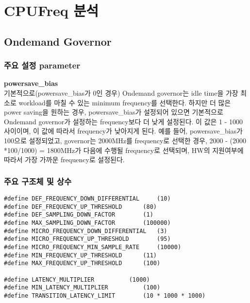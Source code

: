 
\section{CPUFreq 분석}


\subsection{Ondemand Governor}


\subsubsection{주요 설정 parameter}


\textbf{powersave\_bias} \\
기본적으로(powersave\_bias가 0인 경우) Ondemand governor는 idle time을 가장 최소로 workload를 마칠 수 있는 minimum frequency를 선택한다. 
하지만 더 많은 power saving을 원하는 경우, powersave\_bias가 설정되어 있으면 기본적으로 Ondemand governor가 설정하는 frequency보다 더 낮게 설정된다. 
이 값은 1 - 1000 사이이며, 이 값에 따라서 frequency가 낮아지게 된다. 
예를 들어, powersave\_bias가 100으로 설정되었고, governor는 2000MHz를 frequency로 선택한 경우, 2000 - (2000 *100/1000) = 1800MHz가 다음에 수행될 frequency로 선택되며, 
HW의 지원여부에 따라서 가장 가까운 frequency로 설정된다. 

\begin{comment}
\begin{compactenum}
  \item powersavei\_bias
    \begin{compactenum}
      \item 
    \end{compactenum}
\end{compactenum}
\end{comment}



\subsubsection{주요 구조체 및 상수}

\begin{lstlisting}
#define DEF_FREQUENCY_DOWN_DIFFERENTIAL     (10)
#define DEF_FREQUENCY_UP_THRESHOLD      (80)
#define DEF_SAMPLING_DOWN_FACTOR        (1)
#define MAX_SAMPLING_DOWN_FACTOR        (100000)
#define MICRO_FREQUENCY_DOWN_DIFFERENTIAL   (3)
#define MICRO_FREQUENCY_UP_THRESHOLD        (95)
#define MICRO_FREQUENCY_MIN_SAMPLE_RATE     (10000)
#define MIN_FREQUENCY_UP_THRESHOLD      (11)
#define MAX_FREQUENCY_UP_THRESHOLD      (100)

#define LATENCY_MULTIPLIER          (1000)
#define MIN_LATENCY_MULTIPLIER          (100)
#define TRANSITION_LATENCY_LIMIT        (10 * 1000 * 1000)
\end{lstlisting}

